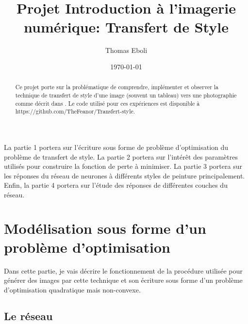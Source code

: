 \documentclass{article}
\author{Thomas Eboli}
\date{\today}
\title{Projet Introduction à l'imagerie numérique: Transfert de Style}
\begin{document}
\maketitle

\begin{abstract}
Ce projet porte sur la problématique de comprendre, implémenter et observer la technique de transfert de style d'une image (souvent un tableau) vers une photographie comme décrit dans \cite{DBLP:journals/corr/GatysEB15a}. Le code utilisé pour ces expériences est disponible à https://github.com/TheFeanor/Transfert-style.
\end{abstract}

\paragraph*{}La partie 1 portera sur l'écriture sous forme de problème d'optimisation du problème de transfert de style. La partie 2 portera sur l'intérêt des paramètres utilisés pour construire la fonction de perte à minimiser. La partie 3 portera sur les réponses du réseau de neurones à différents styles de peinture principalement. Enfin, la partie 4 portera sur l'étude des réponses de différentes couches du réseau.

\section{Modélisation sous forme d'un problème d'optimisation}
\paragraph*{}
Dans cette partie, je vais décrire le fonctionnement de la procédure utilisée pour générer des images par cette technique et son écriture sous forme d'un problème d'optimisation quadratique mais non-convexe.

\subsection*{Le réseau}
\end{document}
